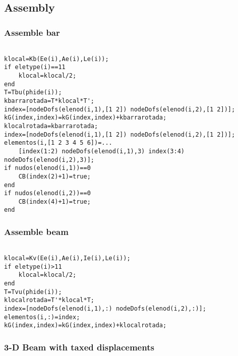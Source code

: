 \subsection{Assembly}
\subsubsection*{Assemble bar}
\begin{code}
\begin{verbatim}

klocal=Kb(Ee(i),Ae(i),Le(i));
if eletype(i)==11
    klocal=klocal/2;
end
T=Tbu(phide(i));
kbarrarotada=T*klocal*T';
index=[nodeDofs(elenod(i,1),[1 2]) nodeDofs(elenod(i,2),[1 2])];
kG(index,index)=kG(index,index)+kbarrarotada;
klocalrotada=kbarrarotada;
index=[nodeDofs(elenod(i,1),[1 2]) nodeDofs(elenod(i,2),[1 2])];
elementos(i,[1 2 3 4 5 6])=...
    [index(1:2) nodeDofs(elenod(i,1),3) index(3:4) nodeDofs(elenod(i,2),3)];
if nudos(elenod(i,1))==0
    CB(index(2)+1)=true;
end
if nudos(elenod(i,2))==0
    CB(index(4)+1)=true;
end
\end{verbatim}
\end{code}
\subsubsection{Assemble beam}
\begin{code}
\begin{verbatim}

klocal=Kv(Ee(i),Ae(i),Ie(i),Le(i));
if eletype(i)>11
    klocal=klocal/2;
end
T=Tvu(phide(i));
klocalrotada=T'*klocal*T;
index=[nodeDofs(elenod(i,1),:) nodeDofs(elenod(i,2),:)];
elementos(i,:)=index;
kG(index,index)=kG(index,index)+klocalrotada;
\end{verbatim}
\end{code}

\subsubsection*{3-D Beam with taxed displacements}

